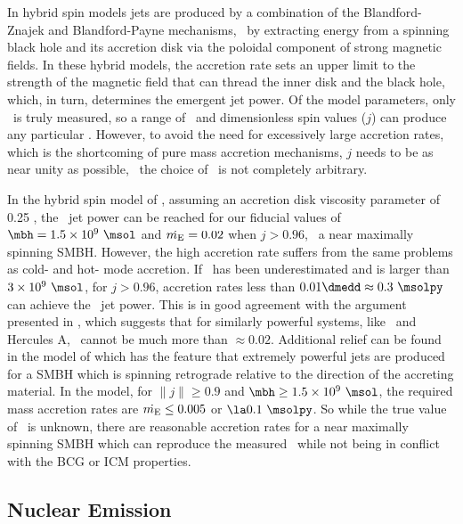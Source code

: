\documentclass[11pt, preprint]{aastex}
\begin{document}
In hybrid spin models \citep[\eg][]{1999ApJ...522..753M,
  2001ApJ...548L...9M, 2006ApJ...651.1023R, 2007MNRAS.377.1652N,
  2009MNRAS.397.1302B, gesspin} jets are produced by a combination of
the Blandford-Znajek \citep{bz} and Blandford-Payne \citep{bp}
mechanisms, \ie\ by extracting energy from a spinning black hole and
its accretion disk via the poloidal component of strong magnetic
fields. In these hybrid models, the accretion rate sets an upper limit
to the strength of the magnetic field that can thread the inner disk
and the black hole, which, in turn, determines the emergent jet
power. Of the model parameters, only \pjet\ is truly measured, so a
range of \dme\ and dimensionless spin values ($j$) can produce any
particular \pjet. However, to avoid the need for excessively large
accretion rates, which is the shortcoming of pure mass accretion
mechanisms, $j$ needs to be as near unity as possible, \ie\ the choice
of \dme\ is not completely arbitrary.

In the hybrid spin model of \citet{2007MNRAS.377.1652N}, assuming an
accretion disk viscosity parameter of 0.25
\citep{1999ApJ...520..298Q}, the \rbs\ jet power can be reached for
our fiducial values of $\mbh = 1.5 \times 10^9 ~\msol$ and $\dot{m_{\rm{E}}} =
0.02$ when $j > 0.96$, \ie\ a near maximally spinning SMBH. However,
the high accretion rate suffers from the same problems as cold- and
hot- mode accretion. If \mbh\ has been underestimated and is larger
than $3 \times 10^9 ~\msol$, for $j > 0.96$, accretion rates less than
$0.01 \dmedd \approx 0.3 ~\msolpy$ can achieve the \rbs\ jet
power. This is in good agreement with the argument presented in
\citet{minaspin}, which suggests that for similarly powerful systems,
like \ms\ and Hercules A, \dme\ cannot be much more than $\approx
0.02$. Additional relief can be found in the model of \citet{gesspin}
which has the feature that extremely powerful jets are produced for a
SMBH which is spinning retrograde relative to the direction of the
accreting material. In the \citet{gesspin} model, for $\|j\| \ge 0.9$
and $\mbh \ge 1.5 \times 10^9 ~\msol$, the required mass accretion
rates are $\dot{m_{\rm{E}}} \le 0.005$ or $\la 0.1 ~\msolpy$. So while the true
value of \dme\ is unknown, there are reasonable accretion rates for a
near maximally spinning SMBH which can reproduce the measured
\pjet\ while not being in conflict with the BCG or ICM properties.

\subsection{Nuclear Emission}
\label{sec:nuc}
\end{document}
